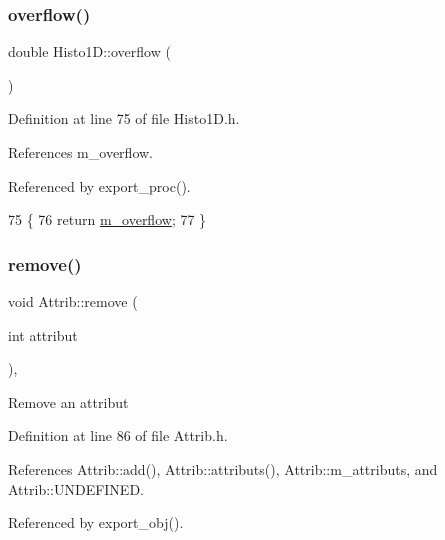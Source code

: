 \subsubsection{\texorpdfstring{overflow()}{overflow()}}
{\footnotesize\ttfamily double Histo1\+D\+::overflow (\begin{DoxyParamCaption}{ }\end{DoxyParamCaption})\hspace{0.3cm}{\ttfamily [inline]}}



Definition at line 75 of file Histo1\+D.\+h.



References m\+\_\+overflow.



Referenced by export\+\_\+proc().


\begin{DoxyCode}
75                    \{
76     \textcolor{keywordflow}{return} \hyperlink{classHisto1D_ab60b2ec4e435a3094b7ec218404aa16f}{m\_overflow};
77   \}
\end{DoxyCode}
\mbox{\label{classAttrib_a7d4ef7e32d93cb287792b87b857e79f3}} 
\subsubsection{\texorpdfstring{remove()}{remove()}}
{\footnotesize\ttfamily void Attrib\+::remove (\begin{DoxyParamCaption}\item[{int}]{attribut }\end{DoxyParamCaption})\hspace{0.3cm}{\ttfamily [inline]}, {\ttfamily [inherited]}}

Remove an attribut 

Definition at line 86 of file Attrib.\+h.



References Attrib\+::add(), Attrib\+::attributs(), Attrib\+::m\+\_\+attributs, and Attrib\+::\+U\+N\+D\+E\+F\+I\+N\+ED.



Referenced by export\+\_\+obj().


